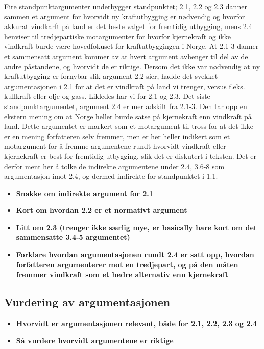 \documentclass[a4paper,11pt,norsk]{article}
\begin{document}
Fire standpunktargumenter underbygger standpunktet; 2.1, 2.2 og 2.3 danner sammen et argument for hvorvidt ny kraftutbygging er nødvendig og hvorfor akkurat 
vindkarft på land er det beste valget for fremtidig utbygging, mens 2.4 henviser til tredjepartiske motargumenter for hvorfor kjernekraft og ikke 
vindkraft burde være hovedfokuset for kraftutbyggingen i Norge. At 2.1-3 danner et sammensatt argument kommer av at hvert argument avhenger til del av de andre påstandene,
og hvorvidt de er riktige. Dersom det ikke var nødvendig at ny kraftutbygging er fornybar slik argument 2.2 sier, 
hadde det svekket argumentasjonen i 2.1 for at det er vindkraft på land vi trenger, versus f.eks. kullkraft eller olje og gass.
Likledes har vi for 2.1 og 2.3. Det siste standpunktargumentet, argument 2.4 er mer adskilt fra 2.1-3. Den tar opp en ekstern mening 
om at Norge heller burde satse på kjernekraft enn vindkraft på land. Dette argumentet er markert som et motargument til tross for at det ikke er en mening 
forfatteren selv fremmer, men er her heller indikert som et motargument for å fremme argumentene rundt hvorvidt vindkraft eller kjernekraft er best for 
fremtidig utbygging, slik det er diskutert i teksten. Det er derfor ment her å tolke de indirekte argumentene under 2.4, 3.6-8 som argumentasjon imot 2.4, og dermed indirekte
for standpunktet i 1.1.

\begin{itemize}
    
    \item \textbf{Snakke om indirekte argument for 2.1}
    \item \textbf{Kort om hvordan 2.2 er et normativt argument}
    \item \textbf{Litt om 2.3 (trenger ikke særlig mye, er basically bare kort om det sammensatte 3.4-5 argumentet)}
    \item \textbf{Forklare hvordan argumentasjonen rundt 2.4 er satt opp, hvordan forfatteren argumenterer mot en tredjepart, og på den måten fremmer vindkraft
                  som et bedre alternativ enn kjernekraft}
\end{itemize}

\subsection*{Vurdering av argumentasjonen}
\begin{itemize}
    \item \textbf{Hvorvidt er argumentasjonen relevant, både for 2.1, 2.2, 2.3 og 2.4}

    \item \textbf{Så vurdere hvorvidt argumentene er riktige}
\end{itemize}
\end{document}
